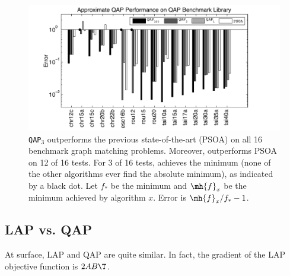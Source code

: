 \documentclass[10pt,journal,cspaper,compsoc]{IEEEtran}
\begin{document}
\begin{figure}[htbp]
	\centering			
	\includegraphics[width=1.0\linewidth]{../figs/benchmarks.pdf}
	\caption{\texttt{QAP}$_3$ outperforms the previous state-of-the-art (PSOA) on all 16 benchmark graph matching problems.  Moreover, \qapa outperforms PSOA on 12 of 16 tests.  For 3 of 16 tests, \qapb achieves the minimum (none of the other algorithms ever find the absolute minimum), as indicated by a black dot.  Let $f_*$ be the minimum and $\mh{f}_x$ be the minimum achieved by algorithm $x$.  Error is $\mh{f}_x/f_*-1$.  }
	\label{fig:fwpath}
\end{figure}





\subsection{LAP vs. QAP} %
\label{sub:lap_vs_qap}

At surface, LAP and QAP are quite similar.  In fact, the gradient of the LAP objective function is $2AB\T$.
\end{document}
